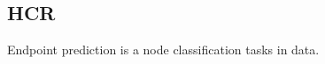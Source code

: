 \newpage %
\subsection{HCR}
\label{subsec:hcr_def}

Endpoint prediction is a node classification tasks in data. 

